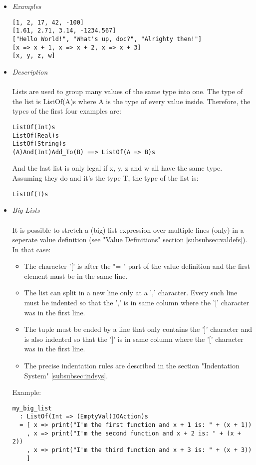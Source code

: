 \documentclass{article}
\begin{document}
\begin{itemize}

\item \textit{Examples}
\begin{verbatim}
[1, 2, 17, 42, -100]
[1.61, 2.71, 3.14, -1234.567]
["Hello World!", "What's up, doc?", "Alrighty then!"]
[x => x + 1, x => x + 2, x => x + 3]
[x, y, z, w]
\end{verbatim}

\item \textit{Description} \\\\
Lists are used to group many values of the same type into one. 
The type of the list is ListOf(A)s where A is the type of every value inside.
Therefore, the types of the first four examples are:
\begin{verbatim}
ListOf(Int)s
ListOf(Real)s
ListOf(String)s
(A)And(Int)Add_To(B) ==> ListOf(A => B)s
\end{verbatim}
And the last list is only legal if x, y, z and w all have the same type. Assuming 
they do and it's the type T, the type of the list is: 
\begin{verbatim}
ListOf(T)s
\end{verbatim}

\item \textit{Big Lists} \\\\
It is possible to stretch a (big) list expression over multiple lines (only) in
a seperate value definition (see "Value Definitions" section
\ref{subsubsec:valdefs}).  In that case:
\begin{itemize}
\item
The character '[' is after the "= " part of the value definition
and the first element must be in the same line.

\item
The list can split in a new line only at a ',' character. Every such line must
be indented so that the ',' is in same column where the '[' character was in
the first line.

\item
The tuple must be ended by a line that only contains the ']' character and is 
also indented so that the ']' is in same column where the '[' character was in
the first line.

\item
The precise indentation rules are described in the section
"Indentation System" \ref{subsubsec:indsys}.
\end{itemize}
Example:
\begin{verbatim}
my_big_list
  : ListOf(Int => (EmptyVal)IOAction)s
  = [ x => print("I'm the first function and x + 1 is: " + (x + 1))
    , x => print("I'm the second function and x + 2 is: " + (x + 2))
    , x => print("I'm the third function and x + 3 is: " + (x + 3))
    ]
\end{verbatim}


\end{itemize}
\end{document}
